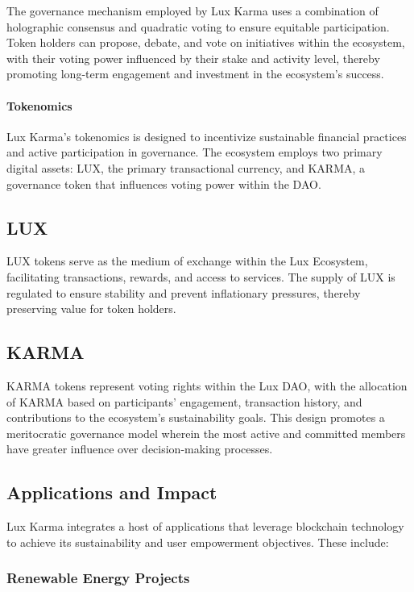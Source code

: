 \documentclass[11pt]{article}
\begin{document}
The governance mechanism employed by Lux Karma uses a combination of holographic consensus and quadratic voting to ensure equitable participation. Token holders can propose, debate, and vote on initiatives within the ecosystem, with their voting power influenced by their stake and activity level, thereby promoting long-term engagement and investment in the ecosystem's success.


\paragraph{Tokenomics}

Lux Karma's tokenomics is designed to incentivize sustainable financial practices and active participation in governance. The ecosystem employs two primary digital assets: LUX, the primary transactional currency, and KARMA, a governance token that influences voting power within the DAO.


\subsection{LUX}

LUX tokens serve as the medium of exchange within the Lux Ecosystem, facilitating transactions, rewards, and access to services. The supply of LUX is regulated to ensure stability and prevent inflationary pressures, thereby preserving value for token holders.


\subsection{KARMA}

KARMA tokens represent voting rights within the Lux DAO, with the allocation of KARMA based on participants' engagement, transaction history, and contributions to the ecosystem's sustainability goals. This design promotes a meritocratic governance model wherein the most active and committed members have greater influence over decision-making processes.


\subsection{Applications and Impact}

Lux Karma integrates a host of applications that leverage blockchain technology to achieve its sustainability and user empowerment objectives. These include:


\subsubsection{Renewable Energy Projects}
\end{document}

